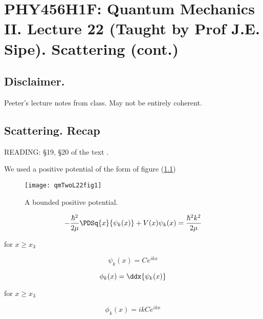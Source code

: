 
%

\chapter{PHY456H1F: Quantum Mechanics II.  Lecture 22 (Taught by Prof J.E. Sipe).  Scattering (cont.)}
\label{chap:qmTwoL22}
{}
\date{Nov 28, 2011}

\beginArtWithToc

\section{Disclaimer.}

Peeter's lecture notes from class.  May not be entirely coherent.

\section{Scattering.  Recap}

READING: \S 19, \S 20 of the text \cite{desai2009quantum}.

We used a positive potential of the form of figure (\ref{fig:qmTwoL22:qmTwoL22fig1})
\begin{figure}[htp]
   \centering
   \texttt{[image: qmTwoL22fig1]}
   \caption{A bounded positive potential.}\label{fig:qmTwoL22:qmTwoL22fig1}
\end{figure}

\begin{equation}\label{eqn:qmTwoL22:10}
-\frac{\hbar^2}{2 \mu} \PDSq{x}{\psi_k(x)} + V(x) \psi_k(x) = \frac{\hbar^2 k^2}{2 \mu}
\end{equation}

for $x \ge x_3$

\begin{equation}\label{eqn:qmTwoL22:30}
\psi_k(x) = C e^{i k x}
\end{equation}

\begin{equation}\label{eqn:qmTwoL22:50}
\phi_k(x) = \ddx{\psi_k(x)}
\end{equation}

for $x \ge x_3$

\begin{equation}\label{eqn:qmTwoL22:70}
\phi_k(x) = i k C e^{i k x}
\end{equation}

